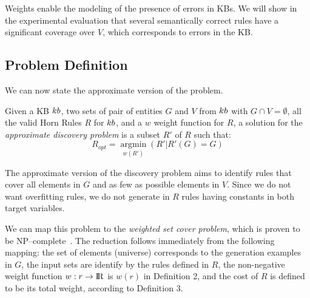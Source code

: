 Weights enable the modeling of the presence of errors in KBs. We will show in the experimental evaluation that several semantically correct rules have a significant coverage over $V$, which corresponds to errors in the KB. 

\vspace{-1ex}	
\subsection{Problem Definition} \label{sec:krd_prob_def}
\vspace{-1ex}	
We can now state the approximate version of the problem.

\begin{definition}
	Given a KB ${\sc kb}$, two sets of pair of entities $G$ and $V$ from ${\sc kb}$ with $G \cap V = \emptyset$, all the valid Horn Rules $R$ for ${\sc kb}$, and a $w$ weight function for $R$, a solution for the \emph{approximate discovery problem} is a subset $R'$ of $R$  such that:
%
	$$R_{opt}=\underset{w(R')}{\operatorname{argmin}}(R'|R'(G) = G)$$
\end{definition}
\vspace{-1ex}	

The approximate version of the discovery problem aims to identify rules that cover all elements in $G$ and as few as possible elements in $V$. Since we do not want overfitting rules, we do not generate in $R$ rules having constants in both target variables.

We can map this problem to the {\em weighted set cover problem}, which is proven to be NP--complete~\cite{chvatal1979greedy}. The reduction follows immediately from the following mapping: 
the set of elements (universe) corresponds to the generation examples in $G$, the input sets are identify by the rules defined in $R$, the non-negative weight
function $w: r \rightarrow {\rm I\!R}$ is $w(r)$ in Definition 2, and the cost of $R$ is defined to be its total weight, according to Definition 3. %


